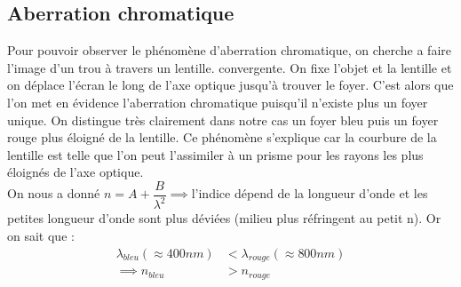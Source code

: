 \documentclass[12pt,a4paper]{article}
\begin{document}
\subsection{Aberration chromatique}
Pour pouvoir observer le phénomène d'aberration chromatique, on cherche a faire l'image d'un trou à travers un lentille. convergente. On fixe l'objet et la lentille et on déplace l'écran le long de l'axe optique jusqu'à trouver le foyer. C'est alors que l'on met en évidence l'aberration chromatique puisqu'il n'existe plus un foyer unique. On distingue très clairement dans notre cas un foyer bleu puis un foyer rouge plus éloigné de la lentille. Ce phénomène s'explique car la courbure de la lentille est telle que l'on peut l'assimiler à un prisme pour les rayons les plus éloignés de l'axe optique.\\
On nous a donné $n=A+\dfrac{B}{\lambda^2}\implies$l'indice dépend de la longueur d'onde et les petites longueur d'onde sont plus déviées (milieu plus réfringent au petit n). Or on sait que :
\begin{align*}
\lambda_{bleu}(\approx400nm)&<\lambda_{rouge}(\approx800nm)\\
\implies n_{bleu}&>n_{rouge}
\end{align*}
\end{document}
